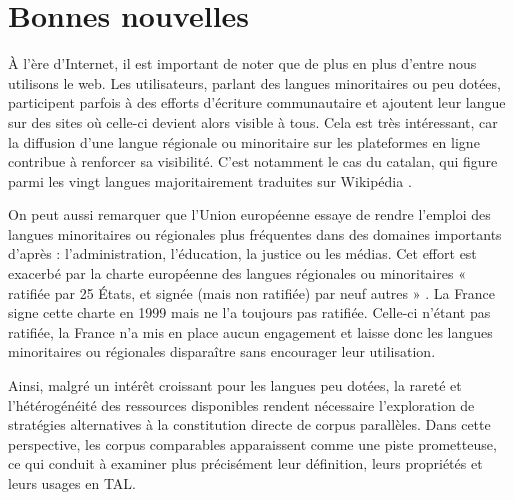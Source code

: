 \section{Bonnes nouvelles}

À l'ère d'Internet, il est important de noter que de plus en plus d'entre nous utilisons le web. Les
utilisateurs, parlant des langues minoritaires ou peu dotées, participent parfois à des efforts
d'écriture communautaire et ajoutent leur langue sur des sites où celle-ci devient alors visible à tous.
Cela est très intéressant, car la diffusion d’une langue régionale ou minoritaire sur les plateformes en
ligne contribue à renforcer sa visibilité. C’est notamment le cas du catalan, qui figure parmi les
vingt langues majoritairement traduites sur Wikipédia \citep{gerken_2022}.

On peut aussi remarquer que l'Union européenne essaye de rendre l'emploi des langues minoritaires ou
régionales plus fréquentes dans des domaines importants d'après \citet{gerken_2022}{ :} l'administration,
l'éducation, la justice ou les médias. Cet effort est exacerbé par la charte européenne des langues
régionales ou minoritaires {« }ratifiée par 25 États, et signée (mais non ratifiée) par neuf autres{ »}
\citep{gerken_2022}. La France signe cette charte en 1999 mais ne l'a toujours pas ratifiée. Celle-ci n'étant
pas ratifiée, la France n'a mis en place aucun engagement et laisse donc les langues minoritaires ou régionales
disparaître sans encourager leur utilisation.

Ainsi, malgré un intérêt croissant pour les langues peu dotées, la rareté et l’hétérogénéité des ressources disponibles
rendent nécessaire l’exploration de stratégies alternatives à la constitution directe de corpus parallèles.
Dans cette perspective, les corpus comparables apparaissent comme une piste prometteuse, ce qui conduit à examiner
plus précisément leur définition, leurs propriétés et leurs usages en TAL.